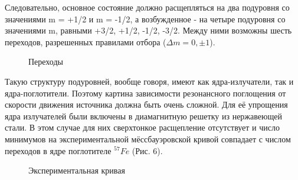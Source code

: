 \documentclass{article}
\begin{document}
\indent Следовательно, основное состояние должно расщепляться на два подуровня со значениями m = +1/2 и m = -1/2, а возбужденное - на четыре подуровня со значениями m, равными +3/2, +1/2, -1/2, -3/2. Между ними возможны шесть переходов, разрешенных правилами отбора ($\Delta m = 0, \pm 1$).

\begin{figure}[h]
\caption{Переходы}
\label{fig:image}
\end{figure}

\indent Такую структуру подуровней, вообще говоря, имеют как ядра-излучатели, так и ядра-поглотители. Поэтому картина зависимости резонансного поглощения от скорости движения источника должна быть очень сложной. Для её упрощения ядра излучателей были включены в диамагнитную решетку из нержавеющей стали. В этом случае для них сверхтонкое расщепление отсутствует и число минимумов на экспериментальной мёссбауэровской кривой совпадает с числом переходов в ядре поглотителе $^{57}Fe$ (Рис. 6). 

\begin{figure}[h]
\caption{Экспериментальная кривая}
\label{fig:image}
\end{figure}
\end{document}
